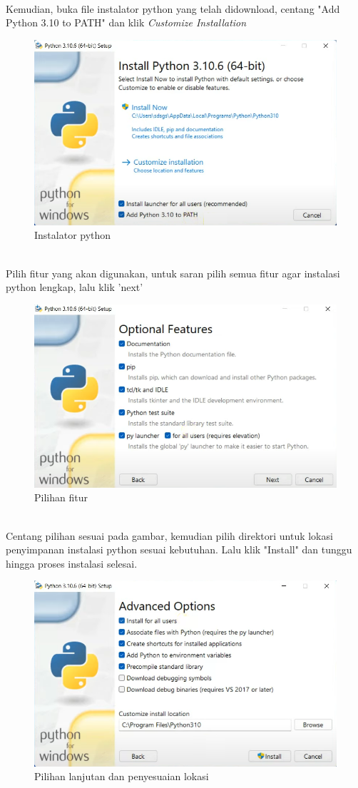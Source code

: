 \\Kemudian, buka file instalator python yang telah didownload, centang "Add Python 3.10 to PATH" dan klik \emph{Customize Installation}
\begin{figure}[h!]
    \centering
    \includegraphics[width=0.9\linewidth]{images/py_1.PNG}
    \caption{Instalator python}
\end{figure}
\\Pilih fitur yang akan digunakan, untuk saran pilih semua fitur agar instalasi python lengkap, lalu klik 'next'
\begin{figure}[h!]
    \centering
    \includegraphics[width=0.9\linewidth]{images/py_2.PNG}
    \caption{Pilihan fitur}
\end{figure}
\\Centang pilihan sesuai pada gambar, kemudian pilih direktori untuk lokasi penyimpanan instalasi python sesuai kebutuhan. Lalu klik "Install" dan tunggu hingga proses instalasi selesai.
\begin{figure}[h!]
    \centering
    \includegraphics[width=0.9\linewidth]{images/py_3.PNG}
    \caption{Pilihan lanjutan dan penyesuaian lokasi}
\end{figure}

